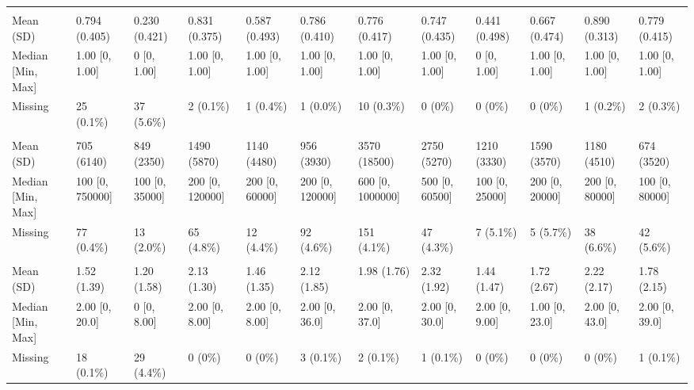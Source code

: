 \documentclass[
  single column]{article}
\begin{document}
\begin{landscape}
\begin{longtable}[t]{llllllllllll}
\addlinespace[0.3em]
\multicolumn{12}{l}{\textbf{Born in New Zealand (Yes/No)}}\\
\hspace{1em}Mean (SD) & 0.794 (0.405) & 0.230 (0.421) & 0.831 (0.375) & 0.587 (0.493) & 0.786 (0.410) & 0.776 (0.417) & 0.747 (0.435) & 0.441 (0.498) & 0.667 (0.474) & 0.890 (0.313) & 0.779 (0.415)\\
\hspace{1em}Median [Min, Max] & 1.00 [0, 1.00] & 0 [0, 1.00] & 1.00 [0, 1.00] & 1.00 [0, 1.00] & 1.00 [0, 1.00] & 1.00 [0, 1.00] & 1.00 [0, 1.00] & 0 [0, 1.00] & 1.00 [0, 1.00] & 1.00 [0, 1.00] & 1.00 [0, 1.00]\\
\hspace{1em}Missing & 25 (0.1\%) & 37 (5.6\%) & 2 (0.1\%) & 1 (0.4\%) & 1 (0.0\%) & 10 (0.3\%) & 0 (0\%) & 0 (0\%) & 0 (0\%) & 1 (0.2\%) & 2 (0.3\%)\\
\addlinespace[0.3em]
\multicolumn{12}{l}{\textbf{Charitable Donations}}\\
\hspace{1em}Mean (SD) & 705 (6140) & 849 (2350) & 1490 (5870) & 1140 (4480) & 956 (3930) & 3570 (18500) & 2750 (5270) & 1210 (3330) & 1590 (3570) & 1180 (4510) & 674 (3520)\\
\hspace{1em}Median [Min, Max] & 100 [0, 750000] & 100 [0, 35000] & 200 [0, 120000] & 200 [0, 60000] & 200 [0, 120000] & 600 [0, 1000000] & 500 [0, 60500] & 100 [0, 25000] & 200 [0, 20000] & 200 [0, 80000] & 100 [0, 80000]\\
\hspace{1em}Missing & 77 (0.4\%) & 13 (2.0\%) & 65 (4.8\%) & 12 (4.4\%) & 92 (4.6\%) & 151 (4.1\%) & 47 (4.3\%) & 7 (5.1\%) & 5 (5.7\%) & 38 (6.6\%) & 42 (5.6\%)\\
\addlinespace[0.3em]
\multicolumn{12}{l}{\textbf{Number of Children}}\\
\hspace{1em}Mean (SD) & 1.52 (1.39) & 1.20 (1.58) & 2.13 (1.30) & 1.46 (1.35) & 2.12 (1.85) & 1.98 (1.76) & 2.32 (1.92) & 1.44 (1.47) & 1.72 (2.67) & 2.22 (2.17) & 1.78 (2.15)\\
\hspace{1em}Median [Min, Max] & 2.00 [0, 20.0] & 0 [0, 8.00] & 2.00 [0, 8.00] & 2.00 [0, 8.00] & 2.00 [0, 36.0] & 2.00 [0, 37.0] & 2.00 [0, 30.0] & 2.00 [0, 9.00] & 1.00 [0, 23.0] & 2.00 [0, 43.0] & 2.00 [0, 39.0]\\
\hspace{1em}Missing & 18 (0.1\%) & 29 (4.4\%) & 0 (0\%) & 0 (0\%) & 3 (0.1\%) & 2 (0.1\%) & 1 (0.1\%) & 0 (0\%) & 0 (0\%) & 0 (0\%) & 1 \vphantom{1} (0.1\%)\\

\end{longtable}
\end{landscape}
\end{document}
